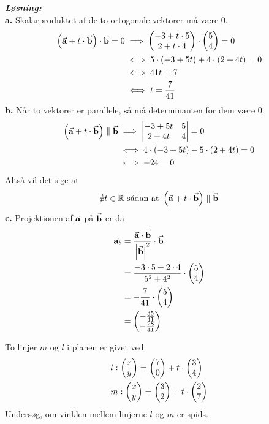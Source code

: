 \documentclass{article}
\newcommand{\sol}{\setlength{\parindent}{0cm}\textbf{\textit{Løsning:}}\setlength{\parindent}{1cm}}
\begin{document}
\sol \\
\textbf{a.}
Skalarproduktet af de to ortogonale vektorer må være 0.
\begin{equation*}
\begin{split}
  \left(\va{a} + t \cdot \va{b} \right) \cdot \va{b} =0 &\implies \mqty(-3+ t \cdot 5\\ 2+t \cdot 4) \cdot \mqty(5\\ 4) =0 \\ 
  &\iff 5 \cdot \left(-3 + 5t\right) + 4 \cdot \left(2+4t\right) =0 \\ 
  &\iff 41t=7 \\ 
  &\iff t=\frac{7}{41}
\end{split}
\end{equation*}
\textbf{b.}
Når to vektorer er parallele, så må determinanten for dem være 0.
\begin{equation*}
\begin{split}
  \left(\va{a} +t \cdot \va{b} \right) \parallel \va{b} &\implies \mdet{-3+5t & 5 \\ 2+4t & 4} =0 \\ 
  &\iff 4 \cdot \left(-3+5t\right) - 5 \cdot \left(2+4t\right) =0 \\ 
  &\iff -24=0
\end{split}
\end{equation*}
Altså vil det sige at
\[
\nexists t \in \mathbb{R} \text{ sådan at }  \left(\va{a} + t \cdot \va{b} \right) \parallel \va{b} 
\] 
\textbf{c.}
Projektionen af $\va{a} $ på $\va{b} $ er da
\begin{equation*}
\begin{split}
  \va{a}_b &=\frac{\va{a} \cdot \va{b} }{\abs{\va{b}}^2} \cdot \va{b}  \\ 
  &= \frac{-3 \cdot 5 + 2 \cdot 4}{5^2+4^2} \cdot \mqty(5\\ 4) \\ 
  &=-\frac{7}{41} \cdot \mqty(5\\ 4) \\ 
  &=\mqty(-\frac{35}{41}\\ -\frac{28}{41}) 
\end{split}
\end{equation*}
\begin{question}{}{}
  To linjer $m \text{ og } l$ i planen er givet ved
  \begin{equation*}
  \begin{split}
    &l:\mqty(x\\ y) =\mqty(7\\ 0) +t \cdot \mqty(3\\ 4) \\ 
    &m: \mqty(x\\ y) =\mqty(3\\ 2) + t \cdot \mqty(2\\ 7) 
  \end{split}
  \end{equation*}
Undersøg, om vinklen mellem linjerne $l$ og $m$ er spids.
\end{question}
\end{document}
